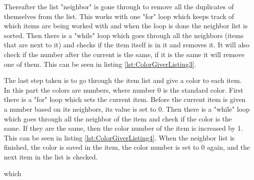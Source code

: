 Thereafter the list "neighbor" is gone through to remove all the duplicates of themselves from the list. This works with one "for" loop which keeps track of which items are being worked with and when the loop is done the neighbor list is sorted. Then there is a "while" loop which goes through all the neighbors (items that are next to it) and checks if the item itself is in it and removes it. It will also check if the number after the current is the same, if it is the same it will remove one of them. This can be seen in listing \ref{lst:ColorGiverListing3}.

The last step taken is to go through the item list and give a color to each item. In this part the colors are numbers, where number 0 is the standard color. First there is a "for" loop which sets the current item. Before the current item is given a number based on its neighbors, its value is set to 0. Then there is a "while" loop which goes through all the neighbor of the item and check if the color is the same. If they are the same, then the color number of the item is increased by 1. This can be seen in listing \ref{lst:ColorGiverListing4}. When the neighbor list is finished, the color is saved in the item, the color number is set to 0 again, and the next item in the list is checked.

which